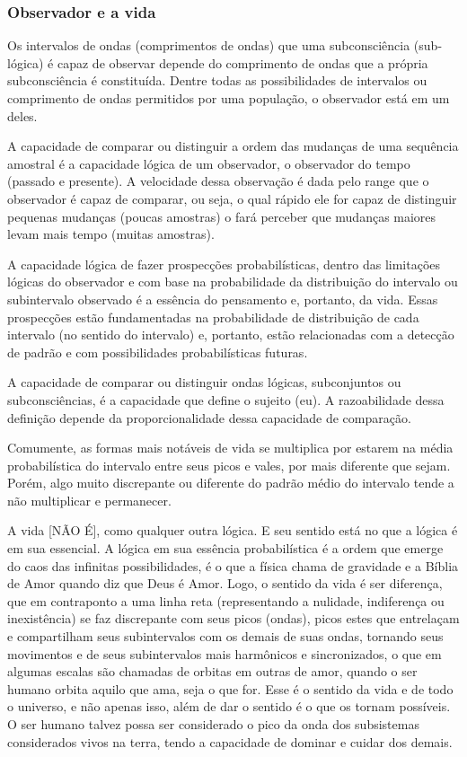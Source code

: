 \subsubsection{Observador e a vida}
Os intervalos de ondas (comprimentos de ondas) que uma subconsciência (sub-lógica) é capaz de observar depende do comprimento de ondas que a própria subconsciência é constituída. Dentre todas as possibilidades de intervalos ou comprimento de ondas permitidos por uma população, o observador está em um deles.

A capacidade de comparar ou distinguir a ordem das mudanças de uma sequência amostral é a capacidade lógica de um observador, o observador do tempo (passado e presente). A velocidade dessa observação é dada pelo range que o observador é capaz de comparar, ou seja, o qual rápido ele for capaz de distinguir pequenas mudanças (poucas amostras) o fará perceber que mudanças maiores levam mais tempo (muitas amostras). 

A capacidade lógica de fazer prospecções probabilísticas, dentro das limitações lógicas do observador e com base na probabilidade da distribuição do intervalo ou subintervalo observado é a essência do pensamento e, portanto, da vida. Essas prospecções estão fundamentadas na probabilidade de distribuição de cada intervalo (no sentido do intervalo) e, portanto, estão relacionadas com a detecção de padrão e com possibilidades probabilísticas futuras.

A capacidade de comparar ou distinguir ondas lógicas, subconjuntos ou subconsciências, é a capacidade que define o sujeito (eu). A razoabilidade dessa definição depende da proporcionalidade dessa capacidade de comparação.

Comumente, as formas mais notáveis de vida se multiplica por estarem na média probabilística do intervalo entre seus picos e vales, por mais diferente que sejam. Porém, algo muito discrepante ou diferente do padrão médio do intervalo tende a não multiplicar e permanecer.

A vida [NÃO É], como qualquer outra lógica. E seu sentido está no que a lógica é em sua essencial. A lógica em sua essência probabilística é a ordem que emerge do caos das infinitas possibilidades, é o que a física chama de gravidade e a Bíblia de Amor quando diz que Deus é Amor. Logo, o sentido da vida é ser diferença, que em contraponto a uma linha reta (representando a nulidade, indiferença ou inexistência) se faz discrepante com seus picos (ondas), picos estes que entrelaçam e compartilham seus subintervalos com os demais de suas ondas, tornando seus movimentos e de seus subintervalos mais harmônicos e sincronizados, o que em algumas escalas são chamadas de orbitas em outras de amor, quando o ser humano orbita aquilo que ama, seja o que for. Esse é o sentido da vida e de todo o universo, e não apenas isso, além de dar o sentido é o que os tornam possíveis. O ser humano talvez possa ser considerado o pico da onda dos subsistemas considerados vivos na terra, tendo a capacidade de dominar e cuidar dos demais. 

